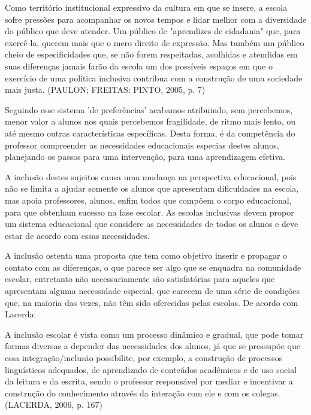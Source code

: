 \documentclass[brasil]{abnt}
\begin{document}
		\begin{citacao}Como território institucional expressivo da cultura em que se insere, a escola sofre pressões para acompanhar os novos tempos e lidar melhor com a diversidade do público que deve atender. 
						Um público de "aprendizes de cidadania" que, para exercê-la, querem mais que o mero direito de expressão. Mas também um público cheio de especificidades que, se não forem respeitadas, 
						acolhidas e atendidas em suas diferenças jamais farão da escola um dos possíveis espaços em que o exercício de uma política inclusiva contribua com a construção de uma sociedade mais 
						justa. (PAULON; FREITAS; PINTO, 2005, p. 7)
		\end{citacao}
	
	Seguindo esse sistema 'de preferências' acabamos atribuindo, sem percebemos, menor valor a alunos nos quais percebemos fragilidade, de ritmo mais lento, ou até mesmo outras características específicas. 
	Desta forma, é da competência do professor compreender as necessidades educacionais especias destes alunos, planejando os passos para uma intervenção, para uma aprendizagem efetiva.
		
	A inclusão destes sujeitos causa uma mudança na perspectiva educacional, pois não se limita a ajudar somente os alunos que apresentam dificuldades na escola, mas apoia professores, alunos,
	enfim todos que compõem o corpo educacional, para que obtenham sucesso na fase escolar. As escolas inclusivas devem propor um sistema educacional que considere as necessidades de todos os alunos e 
	deve estar de acordo com essas necessidades. 
		
	A inclusão ostenta uma proposta que tem como objetivo inserir e propagar o contato com as diferenças, o que parece ser algo que se enquadra na comunidade escolar, entretanto não necessariamente 
	são satisfatórias para aqueles que apresentam alguma necessidade especial, que carecem de uma série de condições que, na maioria das vezes, não têm sido oferecidas pelas escolas. De acordo com Lacerda:
		
			\begin{citacao}A inclusão escolar é vista como um processo dinâmico e gradual, que pode tomar formas diversas a depender das necessidades dos alunos, já que se pressupõe que essa integração/inclusão 
							possibilite, por exemplo, a construção de processos linguísticos adequados, de aprendizado de conteúdos acadêmicos e de uso social da leitura e da escrita, sendo o professor 
							responsável por mediar e incentivar a construção do conhecimento através da interação com ele e com os colegas. (LACERDA, 2006, p. 167)
			\end{citacao}
			
\end{document}
